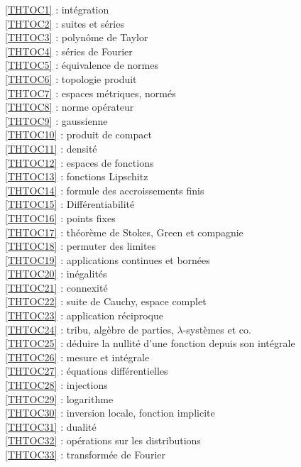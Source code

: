 \ref {THTOC1} : intégration\\
\ref {THTOC2} : suites et séries\\
\ref {THTOC3} : polynôme de Taylor\\
\ref {THTOC4} : séries de Fourier\\
\ref {THTOC5} : équivalence de normes\\
\ref {THTOC6} : topologie produit\\
\ref {THTOC7} : espaces métriques, normés\\
\ref {THTOC8} : norme opérateur\\
\ref {THTOC9} : gaussienne\\
\ref {THTOC10} : produit de compact\\
\ref {THTOC11} : densité\\
\ref {THTOC12} : espaces de fonctions\\
\ref {THTOC13} : fonctions Lipschitz\\
\ref {THTOC14} : formule des accroissements finis\\
\ref {THTOC15} : Différentiabilité\\
\ref {THTOC16} : points fixes\\
\ref {THTOC17} : théorème de Stokes, Green et compagnie\\
\ref {THTOC18} : permuter des limites\\
\ref {THTOC19} : applications continues et bornées\\
\ref {THTOC20} : inégalités\\
\ref {THTOC21} : connexité\\
\ref {THTOC22} : suite de Cauchy, espace complet\\
\ref {THTOC23} : application réciproque\\
\ref {THTOC24} : tribu, algèbre de parties, \( \lambda \)-systèmes et co.\\
\ref {THTOC25} : déduire la nullité d'une fonction depuis son intégrale\\
\ref {THTOC26} : mesure et intégrale\\
\ref {THTOC27} : équations différentielles\\
\ref {THTOC28} : injections\\
\ref {THTOC29} : logarithme\\
\ref {THTOC30} : inversion locale, fonction implicite\\
\ref {THTOC31} : dualité\\
\ref {THTOC32} : opérations sur les distributions\\
\ref {THTOC33} : transformée de Fourier\\

